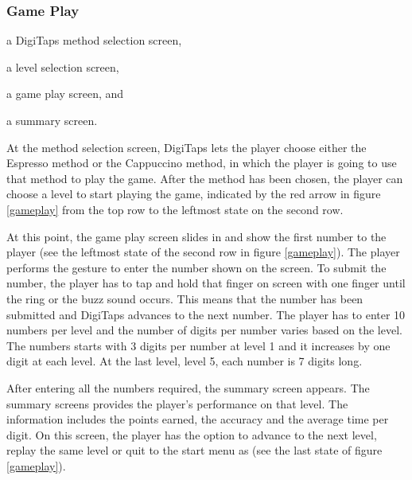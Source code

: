 \subsubsection{Game Play}
    \begin{enumerate*}[(1) ]
      \item a DigiTaps method selection screen, 
      \item a level selection screen, 
      \item a game play screen, and
      \item a summary screen.
    \end{enumerate*}
    At the method selection screen, DigiTaps lets the player choose either the Espresso method or the Cappuccino method, in which the player is going to use that method to play the game. After the method has been chosen, the player can choose a level to start playing the game, indicated by the red arrow in figure \ref{gameplay} from the top row to the leftmost state on the second row.
\par    
At this point, the game play screen slides in and show the first number to the player (see the leftmost state of the second row in figure \ref{gameplay}). The player performs the gesture to enter the number shown on the screen. To submit the number, the player has to tap and hold that finger on screen with one finger until the ring or the buzz sound occurs. This means that the number has been submitted and DigiTaps advances to the next number. The player has to enter 10 numbers per level and the number of digits per number varies based on the level. The numbers starts with 3 digits per number at level 1 and it increases by one digit at each level. At the last level, level 5, each number is 7 digits long.
\par
After entering all the numbers required, the summary screen appears. The summary screens provides the player's performance on that level. The information includes the points earned, the accuracy and the average time per digit. On this screen, the player has the option to advance to the next level, replay the same level or quit to the start menu as (see the last state of figure \ref{gameplay}).

